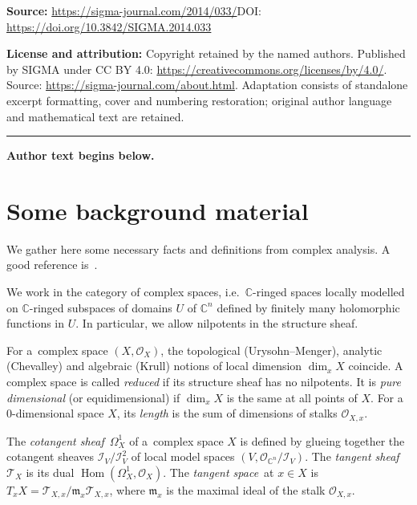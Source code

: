 \documentclass[11pt]{article}
\numberwithin{equation}{section}
\begin{document}
\noindent\textbf{Source:} \url{https://sigma-journal.com/2014/033/}\quad DOI: \url{https://doi.org/10.3842/SIGMA.2014.033}\par
\noindent\textbf{License and attribution:} Copyright retained by the named authors. Published by SIGMA under CC BY 4.0: \url{https://creativecommons.org/licenses/by/4.0/}. Source: \url{https://sigma-journal.com/about.html}. Adaptation consists of standalone excerpt formatting, cover and numbering restoration; original author language and mathematical text are retained.\par
\medskip\hrule\medskip\noindent\textbf{Author text begins below.}\par
\setcounter{section}{1}
\setcounter{subsection}{0}
\setcounter{subsubsection}{0}
\setcounter{Theorem}{0}
\setcounter{equation}{0}
\section{Some background material
\label{back}
}

We gather here some necessary facts and def\/initions from complex analysis.
A good reference is~\cite{GR}.

We work in the category of complex spaces, i.e.\
${\mathbb C}$-ringed spaces locally modelled on ${\mathbb C}$-ringed subspaces of domains $U$ of ${\mathbb C}^n$ def\/ined
by f\/initely many holomorphic functions in $U$.
In particular, we allow nilpotents in the structure sheaf.

For a~complex space $(X,{\mathcal{O}}_X)$, the topological (Urysohn--Menger), analytic (Chevalley) and algebraic (Krull)
notions of local dimension $\dim_xX$ coincide.
A complex space is called {\em reduced} if its structure sheaf has no nilpotents.
It is {\em pure dimensional} (or equidimensional) if $\dim_x X$ is the same at all points of $X$.
For a~$0$-dimensional space $X$, its {\em length} is the sum of dimensions of stalks ${\mathcal{O}}_{X,x}$.

The {\em cotangent sheaf}\, $\Omega^1_X$ of a~complex space $X$ is def\/ined by glueing together the cotangent sheaves
${\mathcal{I}}_V/{\mathcal{I}}_V^2$ of local model spaces $(V, {\mathcal{O}}_{{\mathbb C}^n}/{\mathcal{I}}_V)$.
The {\em tangent sheaf}\, ${\mathcal{T}}_X$ is its dual $\operatorname{Hom}(\Omega^1_X,{\mathcal{O}}_X)$.
The {\em tangent space}\, at $x\in X$ is $T_xX={\mathcal{T}}_{X,x}/\mathfrak{m}_x {\mathcal{T}}_{X,x}$, where
$\mathfrak{m}_x$ is the maximal ideal of the stalk ${\mathcal{O}}_{X,x}$.
\end{document}
